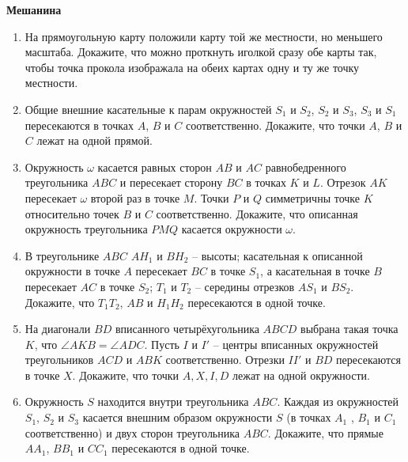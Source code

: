 \documentclass{article}
\begin{document}
\large

\begin{center}
	\textbf{Мешанина}
\end{center}

\begin{enumerate}[label*=\protect\fbox{\arabic{enumi}}]

\item На прямоугольную карту положили карту той же местности, но меньшего масштаба. Докажите, что можно проткнуть иголкой сразу обе карты так, чтобы точка прокола изображала на обеих картах одну и ту же точку местности. 

\item Общие внешние касательные к парам окружностей $S_1$ и $S_2$, $S_2$ и $S_3$, $S_3$ и $S_1$ пересекаются в точках $A$, $B$ и $C$ соответственно. Докажите, что точки $A$, $B$ и $C$ лежат на одной прямой. 

\item Окружность $\omega$ касается равных сторон $AB$ и $AC$ равнобедренного треугольника $ABC$ и пересекает сторону $BC$ в точках $K$ и $L$. Отрезок $AK$ пересекает $\omega$ второй раз в точке $M$. Точки $P$ и $Q$ симметричны точке $K$ относительно точек $B$ и $C$ соответственно. Докажите, что описанная окружность треугольника $PMQ$ касается окружности $\omega$. 

\item В треугольнике $ABC$ $AH_1$ и $BH_2$ – высоты; касательная к описанной окружности в точке $A$ пересекает $BC$ в точке $S_1$, а касательная в точке $B$ пересекает $AC$ в точке $S_2$; $T_1$ и $T_2$ – середины отрезков $AS_1$ и $BS_2$. Докажите, что $T_1T_2$, $AB$ и $H_1H_2$ пересекаются в одной точке.

\item На диагонали $BD$ вписанного четырёхугольника $ABCD$ выбрана такая точка $K$, что $\angle AKB = \angle ADC$. Пусть $I$ и $I'$ – центры вписанных окружностей треугольников $ACD$ и $ABK$ соответственно. Отрезки $II'$ и $BD$ пересекаются в точке $X$. Докажите, что точки $A, X, I, D$ лежат на одной окружности.

\item Окружность $S$ находится внутри треугольника $ABC$. Каждая из окружностей $S_1$, $S_2$ и $S_3$ касается внешним образом окружности $S$ (в точках $A_1$ , $B_1$ и $C_1$ соответственно) и двух сторон треугольника $ABC$. Докажите, что прямые $AA_1$, $BB_1$ и $CC_1$ пересекаются в одной точке. 


\end{enumerate}
\end{document}
